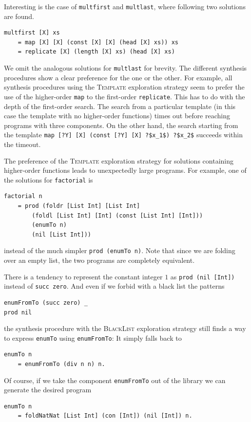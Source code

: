 Interesting is the case of \lstinline?multfirst? and \lstinline?multlast?, where following two solutions are found.
\begin{lstlisting}
multfirst [X] xs
    = map [X] [X] (const [X] [X] (head [X] xs)) xs
    = replicate [X] (length [X] xs) (head [X] xs)
\end{lstlisting}
We omit the analogous solutions for \lstinline!multlast! for brevity.
The different synthesis procedures show a clear preference for the one or the other. For example, all synthesis procedures using the \textsc{Template} exploration strategy seem to prefer the use of the higher-order \lstinline?map? to the first-order \lstinline?replicate?. This has to do with the depth of the first-order search. The search from a particular template (in this case the template with no higher-order functions) times out before reaching programs with three components. On the other hand, the search starting from the template \lstinline!map [?Y] [X] (const [?Y] [X] ?$x_1$) ?$x_2$! succeeds within the timeout.

The preference of the \textsc{Template} exploration strategy for solutions containing higher-order functions leads to unexpectedly large programs. For example, one of the solutions for \lstinline?factorial? is
\begin{lstlisting}
factorial n
    = prod (foldr [List Int] [List Int]
        (foldl [List Int] [Int] (const [List Int] [Int]))
        (enumTo n)
        (nil [List Int]))
\end{lstlisting}
instead of the much simpler \lstinline?prod (enumTo n)?. Note that since we are folding over an empty list, the two programs are completely equivalent.

There is a tendency to represent the constant integer $1$ as \lstinline?prod (nil [Int])? instead of \lstinline?succ zero?. And even if we forbid with a black list the patterns
\begin{lstlisting}
enumFromTo (succ zero) _
prod nil
\end{lstlisting}
the synthesis procedure with the \textsc{BlackList} exploration strategy still finds a way to express \lstinline?enumTo? using \lstinline?enumFromTo?: It simply falls back to 
\begin{lstlisting}
enumTo n
    = enumFromTo (div n n) n.
\end{lstlisting}
Of course, if we take the component \lstinline?enumFromTo? out of the library we can generate the desired program
\begin{lstlisting}
enumTo n
    = foldNatNat [List Int] (con [Int]) (nil [Int]) n.
\end{lstlisting}

